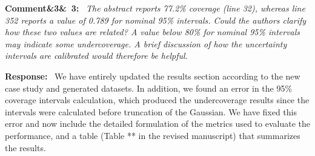 \documentclass[11pt]{article}
\newenvironment{rcomment}[1]{\par\bigskip\noindent\textbf{Comment\ifx&#1&\else\ #1\fi:}\ \itshape}{\par}
\newenvironment{response}{\par\smallskip\noindent\color{resp}\textbf{Response:}\ }{\par}
\begin{document}
\begin{rcomment}{3}
The abstract reports 77.2\% coverage (line 32), whereas line 352 reports a value of 0.789 for nominal 95\% intervals.
Could the authors clarify how these two values are related? A value below 80\% for nominal 95\% intervals may indicate
some undercoverage. A brief discussion of how the uncertainty intervals are calibrated would therefore be helpful.
\end{rcomment}
\begin{response}
	We have entirely updated the results section according to the new case study and generated datasets.
	In addition, we found an error in the 95\% coverage intervals calculation, which produced the undercoverage results since the intervals were calculated before truncation of the Gaussian.
	We have fixed this error and now include the detailed formulation of the metrics used to evaluate the performance, and a table (Table ** in the revised manuscript) that summarizes the results. 
	

\end{response}
\end{document}
